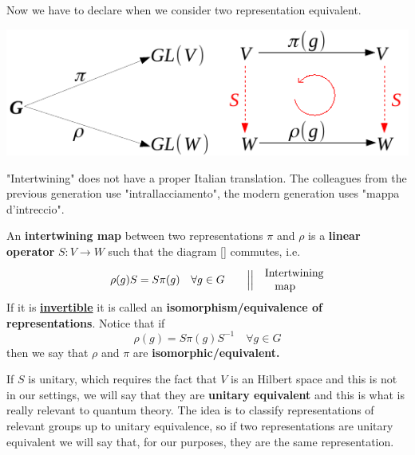 \documentclass[../main.tex]{subfiles}
\begin{document}
Now we have to declare when we consider two representation equivalent.
\begin{marginfigure}[10mm]
	\includegraphics[width=1.2\linewidth]{images/intertwining.pdf}
	\caption[Interwining scheme]{"Intertwining" does not have a proper Italian translation. The colleagues from the previous generation use "intrallacciamento", the modern generation uses "mappa d'intreccio".}
\end{marginfigure}
\begin{definition}
An \textbf{intertwining map} between two representations $\pi$ and $\rho$ is a \textbf{linear operator} $S:V\xrightarrow[]{}W$ such that the diagram [] commutes, i.e. 
\[
\rho(g)S=S\pi(g) \quad \forall g\in G \qquad \Big|\Big|\quad \text{\parbox{1.3cm}{\centering Intertwining\\map}}
\]
If it is \underline{\textbf{invertible}} it is called an \textbf{isomorphism/equivalence of representations}. Notice that if \[
\rho(g)=S\pi(g)S^{-1} \quad \forall g\in G
\]
then we say that $\rho$ and $\pi$ are \textbf{isomorphic/equivalent.}
\end{definition}
If $S$ is unitary, which requires the fact that $V$ is an Hilbert space and this is not in our settings, we will say that they are \textbf{unitary equivalent} and this is what is really relevant to quantum theory. The idea is to classify representations of relevant groups up to unitary equivalence, so if two representations are unitary equivalent we will say that, for our purposes, they are the same representation. 
\end{document}
